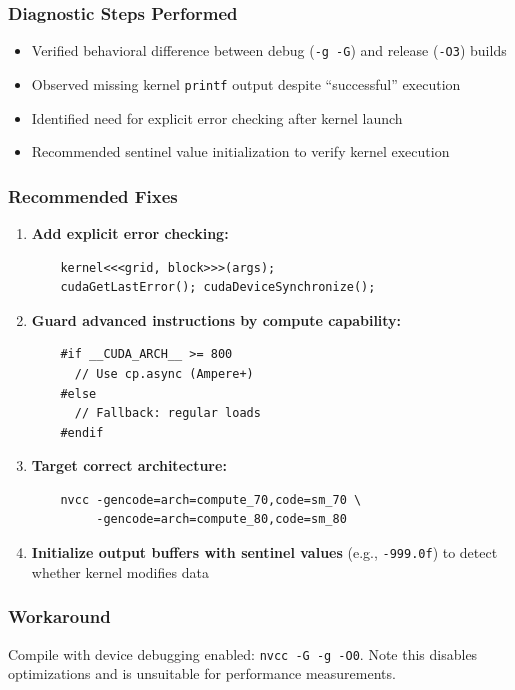 \subsubsection{Diagnostic Steps Performed}

\begin{itemize}
    \item Verified behavioral difference between debug (\texttt{-g -G}) and release (\texttt{-O3}) builds
    \item Observed missing kernel \texttt{printf} output despite ``successful'' execution
    \item Identified need for explicit error checking after kernel launch
    \item Recommended sentinel value initialization to verify kernel execution
\end{itemize}

\subsubsection{Recommended Fixes}

\begin{enumerate}
    \item \textbf{Add explicit error checking:}
    \begin{verbatim}
    kernel<<<grid, block>>>(args);
    cudaGetLastError(); cudaDeviceSynchronize();
    \end{verbatim}
    
    \item \textbf{Guard advanced instructions by compute capability:}
    \begin{verbatim}
    #if __CUDA_ARCH__ >= 800
      // Use cp.async (Ampere+)
    #else
      // Fallback: regular loads
    #endif
    \end{verbatim}
    
    \item \textbf{Target correct architecture:}
    \begin{verbatim}
    nvcc -gencode=arch=compute_70,code=sm_70 \
         -gencode=arch=compute_80,code=sm_80
    \end{verbatim}
    
    \item \textbf{Initialize output buffers with sentinel values} (e.g., \texttt{-999.0f}) to detect whether kernel modifies data
\end{enumerate}

\subsubsection{Workaround}

Compile with device debugging enabled: \texttt{nvcc -G -g -O0}. Note this disables optimizations and is unsuitable for performance measurements.
